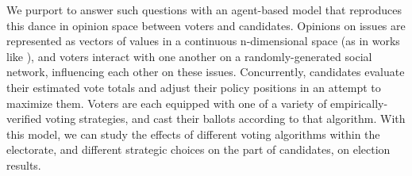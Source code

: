 We purport to answer such questions with an agent-based model that reproduces
this dance in opinion space between voters and candidates. Opinions on issues
are represented as vectors of values in a continuous n-dimensional space (as in
works like \cite{fortunato_vector_2005,lorenz_continuous_2007}), and voters
interact with one another on a randomly-generated social network, influencing
each other on these issues. Concurrently, candidates evaluate their estimated
vote totals and adjust their policy positions in an attempt to maximize them.
Voters are each equipped with one of a variety of empirically-verified voting
strategies, and cast their ballots according to that algorithm. With this
model, we can study the effects of different voting algorithms within the
electorate, and different strategic choices on the part of candidates, on
election results.


